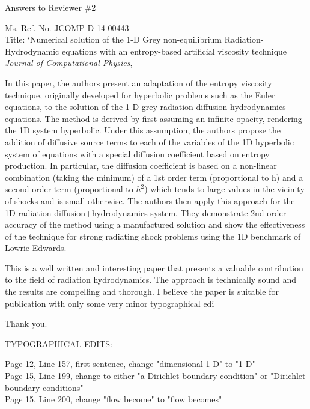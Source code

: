 \documentclass{article}
\begin{document}
\begin{center}
{ \Large Answers to Reviewer \#2}
\end{center}

\bigskip

\noindent Ms. Ref. No. JCOMP-D-14-00443\\
Title: `Numerical solution of the 1-D Grey non-equilibrium Radiation-Hydrodynamic equations with an entropy-based artificial viscosity technique \\
{\it Journal of Computational Physics},\\

\bigskip
\bigskip

{
\color{blue}
In this paper, the authors present an adaptation of the entropy viscosity technique, originally developed for hyperbolic problems such as the Euler equations, to the solution of the 1-D grey radiation-diffusion hydrodynamics equations. The method is derived by first assuming an infinite opacity, rendering  the 1D system hyperbolic. Under this assumption, the authors propose the addition of diffusive source terms to each of the variables of the 1D hyperbolic system of equations with a special diffusion coefficient based on entropy production. In particular, the diffusion coefficient is based on a non-linear combination (taking the minimum) of a 1st order term (proportional to h)  and a second order term (proportional to $h^2$) which tends to large values in the vicinity of shocks and is small otherwise. The authors then apply this approach for the 1D radiation-diffusion+hydrodynamics system. They demonstrate 2nd order accuracy of the method using a manufactured
solution and show the effectiveness of the technique for strong radiating shock problems using the 1D benchmark of Lowrie-Edwards.

This is a well written and interesting paper that presents a valuable contribution to the field of radiation hydrodynamics. The approach is technically sound and the results are compelling and thorough. I believe the paper is suitable for publication with only some very minor typographical edi
}

Thank you. 
\bigskip

{
\color{blue}
\noindent
TYPOGRAPHICAL EDITS:

Page 12, Line 157, first sentence, change "dimensional 1-D" to "1-D" \\
Page 15, Line 199, change to either "a Dirichlet boundary condition" or  "Dirichlet boundary conditions" \\
Page 15,  Line 200, change "flow become" to "flow becomes"}
\end{document}
